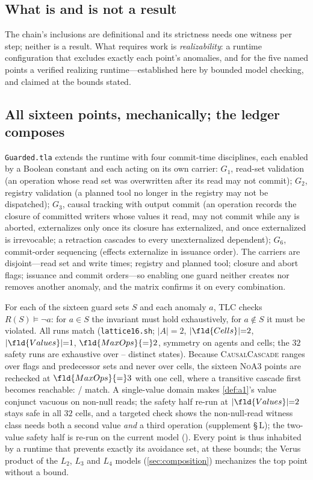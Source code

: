 \subsection{What is and is not a result}
The chain's inclusions are definitional and its strictness needs one witness
per step; neither is a result. What requires work is \emph{realizability}: a
runtime configuration that excludes exactly each point's anomalies, and for
the five named points a verified realizing runtime---established here by
bounded model checking, and claimed at the bounds stated.

\subsection{All sixteen points, mechanically; the ledger composes}
\label{sec:lattice16}
\texttt{Guarded.tla} extends the runtime with four commit-time disciplines,
each enabled by a Boolean constant and each acting on its own carrier: $G_1$,
read-set validation (an operation whose read set was overwritten after its
read may not commit); $G_2$, registry validation (a planned tool no longer in
the registry may not be dispatched); $G_3$, causal tracking with output commit
(an operation records the closure of committed writers whose values it read,
may not commit while any is aborted, externalizes only once its closure has
externalized, and once externalized is irrevocable; a retraction cascades to
every unexternalized dependent); $G_6$, commit-order sequencing (effects
externalize in issuance order). The carriers are disjoint---read set and write
times; registry and planned tool; closure and abort flags; issuance and commit
orders---so enabling one guard neither creates nor removes another anomaly,
and the matrix confirms it on every combination.

For each of the sixteen guard sets $S$ and each anomaly $a$, TLC checks
$R(S)\models\neg a$: for $a\in S$ the invariant must hold exhaustively, for
$a\notin S$ it must be violated. All \LatticeRuns{} runs match
(\texttt{lattice16.sh}; $|A|{=}2$, $|\fld{Cells}|{=}2$, $|\fld{Values}|{=}1$,
$\fld{MaxOps}{=}2$, symmetry on agents and cells; the $32$ safety runs are
exhaustive over \LatticeSafeStatesMin{}--\LatticeSafeStatesMax{} distinct
states). Because \textsc{CausalCascade} ranges over flags and predecessor
sets and never over cells, the sixteen \textsc{NoA3} points are rechecked at
$\fld{MaxOps}{=}3$ with one cell, where a transitive cascade first becomes
reachable: \LatticeMaxOpsThreeRuns{}/\LatticeMaxOpsThreeRuns{} match. A
single-value domain makes \cref{def:a1}'s value conjunct vacuous on non-null
reads; the safety half re-run at $|\fld{Values}|{=}2$ stays safe in all
$32$ cells, and a targeted check shows the non-null-read witness class needs
both a second value \emph{and} a third operation (supplement \S\,L); the
two-value safety half is re-run on the current model (\LatticeVtwoOutcome).
Every point is thus inhabited by a runtime that prevents exactly its
avoidance set, at these bounds; the Verus product of the $L_2$, $L_3$ and
$L_4$ models (\cref{sec:composition}) mechanizes the top point without a
bound.

